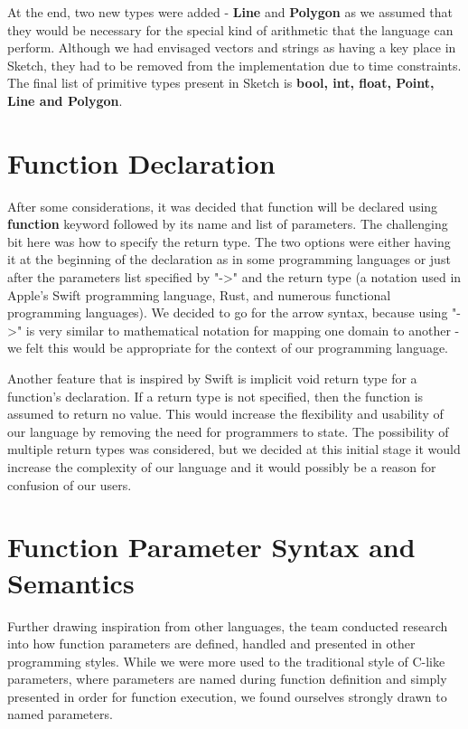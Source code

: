 \documentclass{l3proj}
\begin{document}
At the end, two new types were added - \textbf{Line} and \textbf{Polygon} as we assumed that they would be necessary for the special kind of arithmetic that the language can perform. Although we had envisaged vectors and strings as having a key place in Sketch, they had to be removed from the implementation due to time constraints. The final list of primitive types present in Sketch is \textbf{bool, int, float, Point, Line and Polygon}.

\section {Function Declaration}
After some considerations, it was decided that function will be declared using \textbf{function} keyword followed by its name and list of parameters. The challenging bit here was how to specify the return type. The two options were either having it at the beginning of the declaration as in some programming languages or just after the parameters list specified by "-\textgreater" and the return type (a notation used in Apple's Swift programming language, Rust, and numerous functional programming languages). We decided to go for the arrow syntax, because using "-\textgreater" is very similar to mathematical notation for mapping one domain to another - we felt this would be appropriate for the context of our programming language.

Another feature that is inspired by Swift is implicit void return type for a function's declaration. If a return type is not specified, then the function is assumed to return no value. This would increase the flexibility and usability of our language by removing the need for programmers to state.
The possibility of multiple return types was considered, but we decided at this initial stage it would increase the complexity of our language and it would possibly be a reason for confusion of our users.

\section{Function Parameter Syntax and Semantics}
Further drawing inspiration from other languages, the team conducted research into how function parameters are defined, handled and presented in other programming styles. While we were more used to the traditional style of C-like parameters, where parameters are named during function definition and simply presented in order for function execution, we found ourselves strongly drawn to named parameters.
\end{document}
